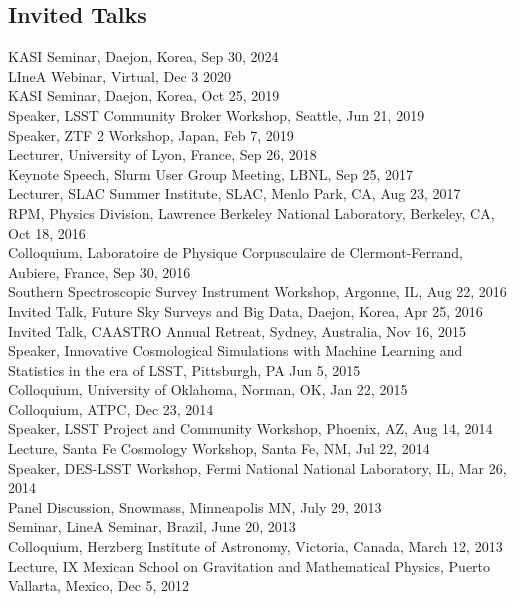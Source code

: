 \documentclass[line, margin]{res}
\begin{document}
\begin{resume}
\section{Invited Talks}
KASI Seminar, Daejon, Korea, Sep 30, 2024\\
LIneA Webinar, Virtual, Dec 3 2020\\
KASI Seminar, Daejon, Korea, Oct 25, 2019\\
Speaker, LSST Community Broker Workshop, Seattle, Jun 21, 2019\\
Speaker, ZTF 2 Workshop, Japan, Feb 7, 2019\\
Lecturer, University of Lyon, France, Sep 26, 2018 \\
Keynote Speech, Slurm User Group Meeting, LBNL, Sep 25, 2017\\
Lecturer, SLAC Summer Institute, SLAC, Menlo Park, CA, Aug 23, 2017\\
RPM, Physics Division, Lawrence Berkeley National Laboratory, Berkeley, CA, Oct 18, 2016\\
Colloquium, Laboratoire de Physique Corpusculaire de Clermont-Ferrand, Aubiere, France, Sep 30, 2016\\
Southern Spectroscopic Survey Instrument Workshop, Argonne, IL, Aug 22, 2016\\
Invited Talk, Future Sky Surveys and Big Data, Daejon, Korea, Apr 25, 2016\\
Invited Talk, CAASTRO Annual Retreat, Sydney, Australia, Nov 16, 2015\\
Speaker, Innovative Cosmological Simulations with Machine Learning and Statistics in the era of LSST, Pittsburgh, PA  Jun 5, 2015\\
Colloquium, University of Oklahoma, Norman, OK, Jan 22, 2015\\
Colloquium, ATPC, Dec 23, 2014\\
Speaker, LSST Project and Community Workshop, Phoenix, AZ, Aug 14, 2014\\
Lecture, Santa Fe Cosmology Workshop, Santa Fe, NM, Jul 22, 2014\\
Speaker, DES-LSST Workshop, Fermi National National Laboratory, IL, Mar 26, 2014\\
Panel Discussion, Snowmass, Minneapolis MN, July 29, 2013\\
Seminar, LineA Seminar, Brazil, June 20, 2013\\
Colloquium, Herzberg Institute of Astronomy, Victoria, Canada, March 12, 2013\\
Lecture, IX Mexican School on Gravitation and Mathematical Physics, Puerto Vallarta, Mexico, Dec 5, 2012\\

\end{resume}
\end{document}
